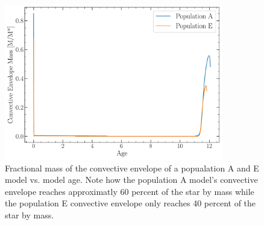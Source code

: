 \begin{figure}
  \centering
  \includegraphics[width=0.85\textwidth]{figures/rgbb/ConvectiveEnvelopeMass.pdf}
  \caption{Fractional mass of the convective envelope of a popualation A and E
  model vs. model age. Note how the population A model's convective envelope
  reaches approximatly 60 percent of the star by mass while the population E
  convective envelope only reaches 40 percent of the star by mass.}
  \label{fig:convEnvMass}
\end{figure}
